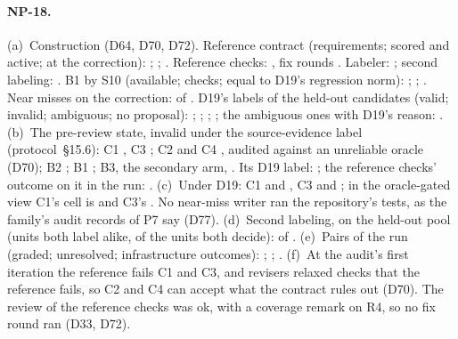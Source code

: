 \paragraph{NP-18.}
(a)~Construction (D64, D70, D72). Reference contract (requirements; scored and active; at the correction):
; ; . Reference checks:
, fix rounds . Labeler: ; second labeling:
. B1 by S10 (available; checks; equal to D19's regression norm): ;
; . Near misses on the correction:  of
. D19's labels of the held-out candidates (valid; invalid; ambiguous; no proposal):
; ; ; ; the ambiguous ones
with D19's reason: .
(b)~The pre-review state, invalid under the source-evidence label (protocol~\S15.6): C1 , C3
; C2  and C4 , audited against an unreliable oracle (D70); B2
; B1 ; B3, the secondary arm, . Its D19 label: ; the
reference checks' outcome on it in the run: .
(c)~Under D19: C1  and , C3  and ; in the oracle-gated
view C1's cell is  and C3's . No near-miss writer ran the repository's tests, as the
family's audit records of P7 say (D77).
(d)~Second labeling, on the held-out pool (units both label alike, of the units both decide): 
of .
(e)~Pairs of the run (graded; unresolved; infrastructure outcomes): ; ;
.
(f)~At the audit's first iteration the reference fails C1 and C3, and revisers relaxed checks that the reference fails,
so C2 and C4 can accept what the contract rules out (D70). The review of the reference checks was ok, with a coverage
remark on R4, so no fix round ran (D33, D72).

